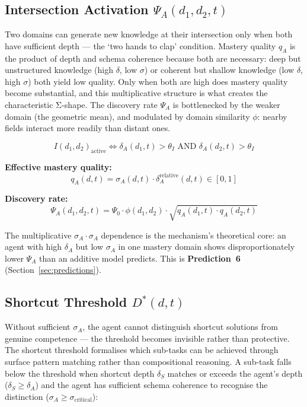 \subsection{Intersection Activation \texorpdfstring{$\Psi_A(d_1,d_2,t)$}{Psi\_A(d\_1,d\_2,t)}}\label{sec:intersection}

Two domains can generate new knowledge at their intersection only when both have sufficient depth --- the `two hands to clap' condition. Mastery quality $q_A$ is the product of depth and schema coherence because both are necessary: deep but unstructured knowledge (high $\delta$, low $\sigma$) or coherent but shallow knowledge (low $\delta$, high $\sigma$) both yield low quality. Only when both are high does mastery quality become substantial, and this multiplicative structure is what creates the characteristic Σ-shape. The discovery rate $\Psi_A$ is bottlenecked by the weaker domain (the geometric mean), and modulated by domain similarity $\phi$: nearby fields interact more readily than distant ones.

\begin{equation}\label{eq:activation-condition}
I(d_1,d_2)_{\text{active}} \iff \delta_A(d_1,t) > \theta_I \text{ AND } \delta_A(d_2,t) > \theta_I
\end{equation}

\textbf{Effective mastery quality:}
\begin{equation}\label{eq:mastery-quality}
q_A(d,t) = \sigma_A(d,t) \cdot \delta_A^{\text{relative}}(d,t) \in [0,1]
\end{equation}

\textbf{Discovery rate:}
\begin{equation}\label{eq:discovery-rate}
\Psi_A(d_1,d_2,t) = \Psi_0 \cdot \phi(d_1,d_2) \cdot \sqrt{q_A(d_1,t) \cdot q_A(d_2,t)}
\end{equation}

The multiplicative $\sigma_A \cdot \sigma_A$ dependence is the
mechanism's theoretical core: an agent with high $\delta_A$ but low
$\sigma_A$ in one mastery domain shows disproportionately lower $\Psi_A$
than an additive model predicts. This is \textbf{Prediction~6}
(Section~\ref{sec:predictions}).

\subsection{Shortcut Threshold \texorpdfstring{$D^*(d,t)$}{D*(d,t)}}\label{sec:shortcut-threshold}

Without sufficient $\sigma_A$, the agent cannot distinguish shortcut solutions from genuine competence --- the threshold becomes invisible rather than protective. The shortcut threshold formalises which sub-tasks can be achieved through surface pattern matching rather than compositional reasoning. A sub-task falls below the threshold when shortcut depth $\delta_S$ matches or exceeds the agent's depth ($\delta_S \geq \delta_A$) and the agent has sufficient schema coherence to recognise the distinction ($\sigma_A \geq \sigma_{\text{critical}}$):

